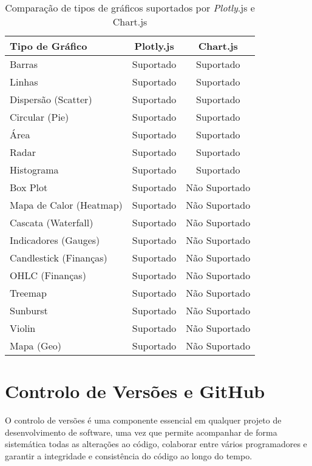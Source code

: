\begin{table}[H]
\centering
\caption{Comparação de tipos de gráficos suportados por \textit{Plotly}.js e Chart.js}
\begin{tabular}{|l|c|c|}
\hline
\textbf{Tipo de Gráfico} & \textbf{Plotly.js} & \textbf{Chart.js} \\
\hline
Barras                         & Suportado & Suportado \\
Linhas                         & Suportado & Suportado \\
Dispersão (Scatter)            & Suportado & Suportado \\
Circular (Pie)                 & Suportado & Suportado \\
Área                           & Suportado & Suportado \\
Radar                          & Suportado & Suportado \\
Histograma                     & Suportado & Suportado \\
Box Plot                       & Suportado & Não Suportado \\
Mapa de Calor (Heatmap)        & Suportado & Não Suportado \\
Cascata (Waterfall)            & Suportado & Não Suportado \\
Indicadores (Gauges)           & Suportado & Não Suportado \\
Candlestick (Finanças)         & Suportado & Não Suportado \\
OHLC (Finanças)                & Suportado & Não Suportado \\
Treemap                        & Suportado & Não Suportado \\
Sunburst                       & Suportado & Não Suportado \\
Violin                         & Suportado & Não Suportado \\
Mapa (Geo)                     & Suportado & Não Suportado \\
\hline
\end{tabular}
\label{tab:charts}
\end{table}

\chapter{Controlo de Versões e GitHub}

O controlo de versões é uma componente essencial em qualquer projeto de desenvolvimento de software, uma vez que permite acompanhar de forma sistemática todas as alterações ao código, colaborar entre vários programadores e garantir a integridade e consistência do código ao longo do tempo.

